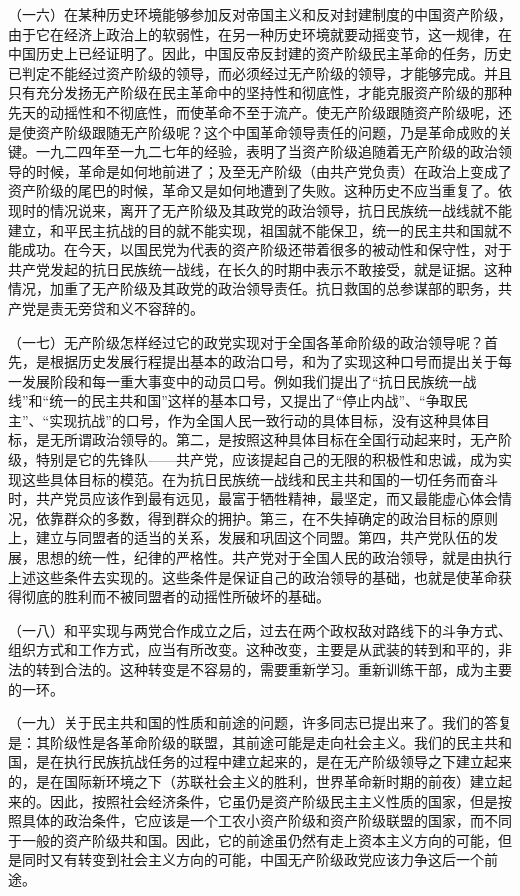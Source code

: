 （一六）在某种历史环境能够参加反对帝国主义和反对封建制度的中国资产阶级，由于它在经济上政治上的软弱性，在另一种历史环境就要动摇变节，这一规律，在中国历史上已经证明了。因此，中国反帝反封建的资产阶级民主革命的任务，历史已判定不能经过资产阶级的领导，而必须经过无产阶级的领导，才能够完成。并且只有充分发扬无产阶级在民主革命中的坚持性和彻底性，才能克服资产阶级的那种先天的动摇性和不彻底性，而使革命不至于流产。使无产阶级跟随资产阶级呢，还是使资产阶级跟随无产阶级呢？这个中国革命领导责任的问题，乃是革命成败的关键。一九二四年至一九二七年的经验，表明了当资产阶级追随着无产阶级的政治领导的时候，革命是如何地前进了；及至无产阶级（由共产党负责）在政治上变成了资产阶级的尾巴的时候，革命又是如何地遭到了失败。这种历史不应当重复了。依现时的情况说来，离开了无产阶级及其政党的政治领导，抗日民族统一战线就不能建立，和平民主抗战的目的就不能实现，祖国就不能保卫，统一的民主共和国就不能成功。在今天，以国民党为代表的资产阶级还带着很多的被动性和保守性，对于共产党发起的抗日民族统一战线，在长久的时期中表示不敢接受，就是证据。这种情况，加重了无产阶级及其政党的政治领导责任。抗日救国的总参谋部的职务，共产党是责无旁贷和义不容辞的。

（一七）无产阶级怎样经过它的政党实现对于全国各革命阶级的政治领导呢？首先，是根据历史发展行程提出基本的政治口号，和为了实现这种口号而提出关于每一发展阶段和每一重大事变中的动员口号。例如我们提出了“抗日民族统一战线”和“统一的民主共和国”这样的基本口号，又提出了“停止内战”、“争取民主”、“实现抗战”的口号，作为全国人民一致行动的具体目标，没有这种具体目标，是无所谓政治领导的。第二，是按照这种具体目标在全国行动起来时，无产阶级，特别是它的先锋队——共产党，应该提起自己的无限的积极性和忠诚，成为实现这些具体目标的模范。在为抗日民族统一战线和民主共和国的一切任务而奋斗时，共产党员应该作到最有远见，最富于牺牲精神，最坚定，而又最能虚心体会情况，依靠群众的多数，得到群众的拥护。第三，在不失掉确定的政治目标的原则上，建立与同盟者的适当的关系，发展和巩固这个同盟。第四，共产党队伍的发展，思想的统一性，纪律的严格性。共产党对于全国人民的政治领导，就是由执行上述这些条件去实现的。这些条件是保证自己的政治领导的基础，也就是使革命获得彻底的胜利而不被同盟者的动摇性所破坏的基础。

（一八）和平实现与两党合作成立之后，过去在两个政权敌对路线下的斗争方式、组织方式和工作方式，应当有所改变。这种改变，主要是从武装的转到和平的，非法的转到合法的。这种转变是不容易的，需要重新学习。重新训练干部，成为主要的一环。

（一九）关于民主共和国的性质和前途的问题，许多同志已提出来了。我们的答复是：其阶级性是各革命阶级的联盟，其前途可能是走向社会主义。我们的民主共和国，是在执行民族抗战任务的过程中建立起来的，是在无产阶级领导之下建立起来的，是在国际新环境之下（苏联社会主义的胜利，世界革命新时期的前夜）建立起来的。因此，按照社会经济条件，它虽仍是资产阶级民主主义性质的国家，但是按照具体的政治条件，它应该是一个工农小资产阶级和资产阶级联盟的国家，而不同于一般的资产阶级共和国。因此，它的前途虽仍然有走上资本主义方向的可能，但是同时又有转变到社会主义方向的可能，中国无产阶级政党应该力争这后一个前途。

